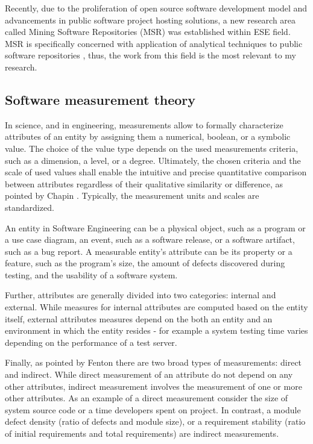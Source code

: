 Recently, due to the proliferation of open source software development model and advancements in public software
project hosting solutions, a new research area called Mining Software Repositories (MSR) was established 
within ESE field. MSR is specifically concerned with application of analytical techniques to public software 
repositories \cite{citeulike:12550438} \cite{citeulike:4534888} \cite{citeulike:2710928}, thus, the work from 
this field is the most relevant to my research.

\subsection{Software measurement theory}
In science, and in engineering, measurements allow to formally characterize attributes of an entity 
by assigning them a numerical, boolean, or a symbolic value. 
The choice of the value type depends on the used measurements criteria, such as a dimension, a level, or a degree. 
Ultimately, the chosen criteria and the scale of used values shall enable the intuitive and precise quantitative 
comparison between attributes regardless of their qualitative similarity or difference,
as pointed by Chapin \cite{citeulike:13158806}. 
Typically, the measurement units and scales are standardized.

An entity in Software Engineering can be a physical object, such as a program or a use case diagram, 
an event, such as a software release, or a software artifact, such as a bug report.
A measurable entity's attribute can be its property or a feature, such as the program's size, the amount of 
defects discovered during testing, and the usability of a software system.

Further, attributes are generally divided into two categories: internal and external. 
While measures for internal attributes are computed based on the entity itself, external attributes measures 
depend on the both an entity and an environment in which the entity resides - for example a system testing 
time varies depending on the performance of a test server.

Finally, as pointed by Fenton \cite{citeulike:1803429} there are two broad types of measurements: direct
and indirect. While direct measurement of an attribute do not depend on any other attributes, 
indirect measurement involves the measurement of one or more other attributes. 
As an example of a direct measurement consider the size of system source code or a time developers spent on 
project. In contrast, a module defect density (ratio of defects and module size), 
or a requirement stability (ratio of initial requirements and total requirements) are indirect measurements.

